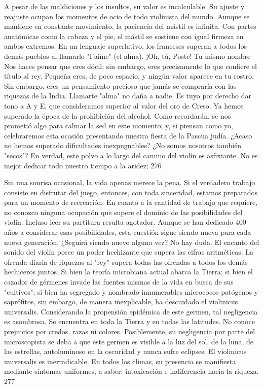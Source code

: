 A pesar de las maldiciones y los insultos, su valor es incalculable. Su ajuste y reajuste ocupan los momentos de ocio de todo violinista del mundo. Aunque se mantiene en constante movimiento, la paciencia del mástil es infinita. Con partes anatómicas como la cabeza y el pie, el mástil se sostiene con igual firmeza en ambos extremos. En un lenguaje superlativo, los franceses superan a todos los demás pueblos al llamarlo "I'aime" (el alma).
¡Oh, tú, Poste! Tu mismo nombre
Nos haces pensar que eres dócil; sin embargo, eres precisamente lo que confiere el título al rey.
Pequeña eres, de poco espacio, y ningún valor aparece en tu rostro.
Sin embargo, eres un pensamiento precioso que jamás se compraría con las riquezas de la India. Llamarte "alma" no daña a nadie.
Es tuyo por derecho dar tono a A y E, que consideramos superior al valor del oro de Creso.
Ya hemos superado la época de la prohibición del alcohol. Como recordarán, se nos prometió algo para calmar la sed en este momento; y, si piensan como yo, celebraremos esta ocasión presentando nuestra fiesta de la Pascua judía.
¿Acaso no hemos superado dificultades inexpugnables?
¿No somos nosotros también "secos"?
En verdad, este polvo a lo largo del camino del violín es asfixiante.
No es mejor dedicar todo nuestro tiempo a la aridez;
276

Sin una sonrisa ocasional, la vida apenas merece la pena. Si el verdadero trabajo consiste en disfrutar del juego, entonces, con toda sinceridad, estamos preparados para un momento de recreación. En cuanto a la cantidad de trabajo que requiere, no conozco ninguna ocupación que supere el dominio de las posibilidades del violín. Incluso leer su partitura resulta agotador. Aunque se han dedicado 400 años a considerar esas posibilidades, esta cuestión sigue siendo nueva para cada nueva generación.
¿Seguirá siendo nuevo alguna vez? No hay duda.
El encanto del sonido del violín posee un poder hechizante que supera las cifras aritméticas. La ofrenda diaria de riquezas al "rey" supera todas las ofrendas a todos los demás hechiceros juntos. Si bien la teoría microbiana actual abarca la Tierra; si bien el cazador de gérmenes invade las fuentes mismas de la vida en busca de sus "cultivos"; si bien ha segregado y nombrado innumerables micrococos patógenos y saprófitos, sin embargo, de manera inexplicable, ha descuidado el violinicus universalis. Considerando la propensión epidémica de este germen, tal negligencia es asombrosa. Se encuentra en toda la Tierra y en todas las latitudes. No conoce prejuicios por credos, razas ni colores. Posiblemente, su negligencia por parte del microscopista se deba a que este germen es visible a la luz del sol, de la luna, de las estrellas, autoluminoso en la oscuridad y nunca sufre eclipses. El violinicus universalis es inerradicable. En todos los climas, su presencia se manifiesta mediante síntomas uniformes, a saber: intoxicación e indiferencia hacia la riqueza.
277

